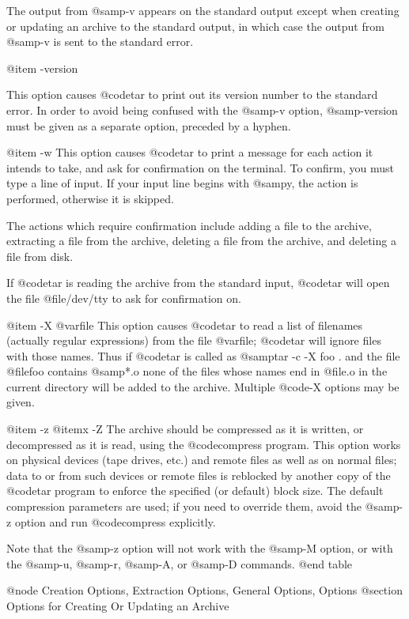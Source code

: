 The output from @samp{-v} appears on the standard output except when
creating or updating an archive to the standard output, 
in which case the output from @samp{-v} is sent to the standard
error.

@item -version

This option causes @code{tar} to print out its version number to the
standard error.  In order to avoid being confused with the @samp{-v}
option, @samp{-version} must be given as a separate option,
preceded by a hyphen.

@item -w
This option causes @code{tar} to print a message for each action it
intends to take, and ask for confirmation on the terminal.  To
confirm, you must type a line of input.  If your input line begins
with @samp{y}, the action is performed, otherwise it is skipped.

The actions which require confirmation include adding a file to the
archive, extracting a file from the archive, deleting a file from the
archive, and deleting a file from disk.

If @code{tar} is reading the archive from the standard input,
@code{tar} will open the file @file{/dev/tty} to ask for
confirmation on.

@item -X @var{file}
This option causes @code{tar} to read a list of filenames
(actually regular expressions) from the file @var{file};
@code{tar} will ignore files with those names.
Thus if @code{tar} is called as @samp{tar -c -X foo .}
and the file @file{foo} contains @samp{*.o} none of the files
whose names end in @file{.o} in the current directory will be added
to the archive.  Multiple @code{-X} options may be given.

@item -z
@itemx -Z
The archive should be compressed as it is written, or decompressed
as it is read, using the @code{compress} program.  This option works
on physical devices (tape drives, etc.) and remote files as well as
on normal files; data to or from such devices or remote files is
reblocked by another copy of the @code{tar} program to enforce the
specified (or default) block size.  The default compression
parameters are used; if you need to override them, avoid the
@samp{-z} option and run @code{compress} explicitly.

Note that the @samp{-z} option will not work with the @samp{-M} option,
or with the @samp{-u}, @samp{-r}, @samp{-A}, or @samp{-D} commands.
@end table

@node Creation Options, Extraction Options, General Options, Options
@section Options for Creating Or Updating an Archive

